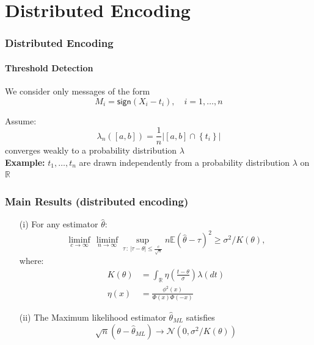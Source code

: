 \documentclass[mathserif]{beamer}
\newcommand{\sgn}{\mathsf{sign}}
\begin{document}
\section{Distributed Encoding}

\begin{frame}
\frametitle{Distributed Encoding}
\framesubtitle{Threshold Detection}
We consider only messages of the form
\[
M_i = \sgn(X_i - t_i),\quad i=1,\ldots,n
\]
\begin{center}
\end{center}
Assume:
\[
\lambda_n([a,b]) = \frac{1}{n} \left| [a,b] \cap \left\{t_i \right\}\right|
\]
converges weakly to a probability distribution $\lambda$
\\
\bigskip
\pause
\textbf{Example:} $t_1,\ldots,t_n$ are drawn independently from a probability distribution $\lambda$ on $\mathbb R$ 

\end{frame}

\begin{frame}
\frametitle{Main Results (distributed encoding)}

\begin{theorem}
\begin{itemize}
\item[(i)] For any estimator $\widehat{\theta}$:
\[
\liminf_{c\rightarrow \infty}\, \liminf_{n\rightarrow \infty} \sup_{\tau\,:\,| \tau - \theta| \leq \frac{c}{\sqrt{n}} }  n \mathbb E \left(\widehat{\theta} - \tau \right)^2 \geq \sigma^2/K(\theta),
\]
where:
\begin{align*}
K(\theta) & = \int_{\mathbb R} \eta\left( \frac{t-\theta}{\sigma}\right) \lambda(dt) \\
\eta(x) & = \frac{\phi^2(x)}{\Phi(x)\Phi(-x)}
\end{align*}
\item[(ii)] The Maximum likelihood estimator $\widehat{\theta}_{ML}$  satisfies
\[
\sqrt{n}(\theta - \widehat{\theta}_{ML}) \rightarrow \mathcal N\left(0,\sigma^2/K(\theta) \right)
\]
\end{itemize}
\end{theorem}
\end{frame}
\end{document}
